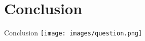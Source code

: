 %
%
\section{Conclusion}
\begin{frame}{Conclusion}
	\only<1>
	{
	}
	\only<2>
	{
		\centering{}
		\texttt{[image: images/question.png]}
	}
\end{frame}